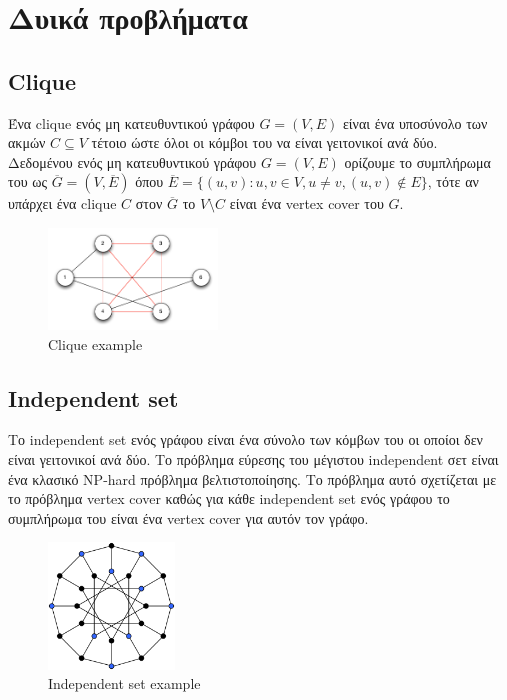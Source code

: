 
\section{Δυικά προβλήματα}

\subsection{Clique}
Ένα clique ενός μη κατευθυντικού γράφου $G=(V,E)$ είναι ένα υποσύνολο των ακμών $C \subseteq V$ τέτοιο ώστε όλοι οι κόμβοι του να είναι γειτονικοί ανά δύο.\\
Δεδομένου ενός μη κατευθυντικού γράφου $G=(V,E)$ ορίζουμε το συμπλήρωμα του ως $\overline{G} = (V, \overline{E})$ όπου $\overline{E} = \{(u,v):u,v \in{V}, u \neq v, (u,v) \notin{E}\}$, τότε αν υπάρχει ένα clique $C$ στον $\overline{G}$ το $V \setminus C$ είναι ένα vertex cover του $G$.

\begin{figure}[H]
\caption{Clique example}
\centering
\includegraphics[width=0.4\textwidth]{Figures/VertexClique.png}\centering
\end{figure}

\subsection{Independent set}
Το independent set ενός γράφου είναι ένα σύνολο των κόμβων του οι οποίοι δεν είναι γειτονικοί ανά δύο. Το πρόβλημα εύρεσης του μέγιστου independent σετ είναι ένα κλασικό NP-hard πρόβλημα βελτιστοποίησης. Το πρόβλημα αυτό σχετίζεται με το πρόβλημα vertex cover καθώς για κάθε independent set ενός γράφου το συμπλήρωμα του είναι ένα vertex cover για αυτόν τον γράφο.	

\begin{figure}[H]
\caption{Independent set example}
\centering
\includegraphics[width=0.3\textwidth]{Figures/indep_set.png}\centering
\end{figure}
